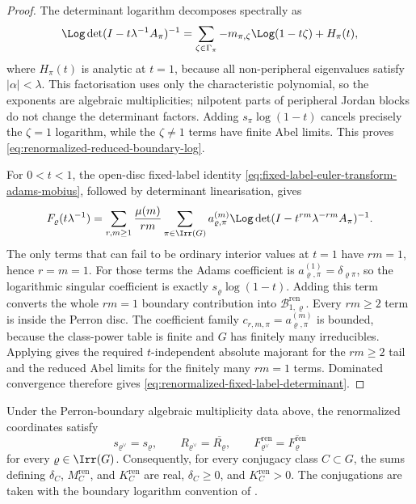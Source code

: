\begin{proof}
  The determinant logarithm decomposes spectrally as
  \[
    \Log\det(I-t\lambda^{-1}A_\pi)^{-1}
    =
    \sum_{\zeta\in\Gamma_\pi}
      -m_{\pi,\zeta}\Log(1-t\zeta)
    +H_\pi(t),
  \]
  where \(H_\pi(t)\) is analytic at \(t=1\), because all non-peripheral
  eigenvalues satisfy \(|\alpha|<\lambda\).  This factorisation uses only
  the characteristic polynomial, so the exponents are algebraic
  multiplicities; nilpotent parts of peripheral Jordan blocks do not change
  the determinant factors.  Adding
  \(s_\pi\log(1-t)\) cancels precisely the \(\zeta=1\) logarithm, while
  the \(\zeta\ne1\) terms have finite Abel limits.  This proves
  \eqref{eq:renormalized-reduced-boundary-log}.

  For \(0<t<1\), the open-disc fixed-label identity
  \eqref{eq:fixed-label-euler-transform-adams-mobius}, followed by
  determinant linearisation, gives
  \[
    F_\varrho(t\lambda^{-1})
    =
    \sum_{r,m\ge1}\frac{\mu(m)}{rm}
      \sum_{\pi\in\Irr(G)}
        a_{\varrho,\pi}^{(m)}
        \Log\det(I-t^{rm}\lambda^{-rm}A_\pi)^{-1}.
  \]
  The only terms that can fail to be ordinary interior values at
  \(t=1\) have \(rm=1\), hence \(r=m=1\).  For those terms the Adams
  coefficient is \(a_{\varrho,\pi}^{(1)}=\delta_{\varrho\pi}\), so the
  logarithmic singular coefficient is exactly \(s_\varrho\log(1-t)\).
  Adding this term converts the whole \(rm=1\) boundary contribution into
  \(\mathcal B_{1,\varrho}^{\mathrm{ren}}\).  Every \(rm\ge2\) term is inside
  the Perron disc.  The coefficient family
  \(c_{r,m,\pi}=a_{\varrho,\pi}^{(m)}\) is bounded, because the class-power
  table is finite and \(G\) has finitely many irreducibles.  Applying
   gives the required
  \(t\)-independent absolute majorant for the \(rm\ge2\) tail and the
  reduced Abel limits for the finitely many \(rm=1\) terms.  Dominated
  convergence therefore gives
  \eqref{eq:renormalized-fixed-label-determinant}.
\end{proof}

\begin{lemma}
  \label{lem:renormalized-reality-positivity}
  Under the Perron-boundary algebraic multiplicity data above, the renormalized
  coordinates satisfy
  \[
    s_{\varrho^\vee}=s_\varrho,\qquad
    R_{\varrho^\vee}=\overline{R_\varrho},\qquad
    F_{\varrho^\vee}^{\mathrm{ren}}
      =\overline{F_\varrho^{\mathrm{ren}}}
  \]
  for every \(\varrho\in\Irr(G)\).  Consequently, for every conjugacy class
  \(C\subset G\), the sums defining
  \(\delta_C\), \(M_C^{\mathrm{ren}}\), and \(K_C^{\mathrm{ren}}\) are real,
  \(\delta_C\ge0\), and \(K_C^{\mathrm{ren}}>0\).
  The conjugations are taken with the boundary logarithm convention of
  .
\end{lemma}

